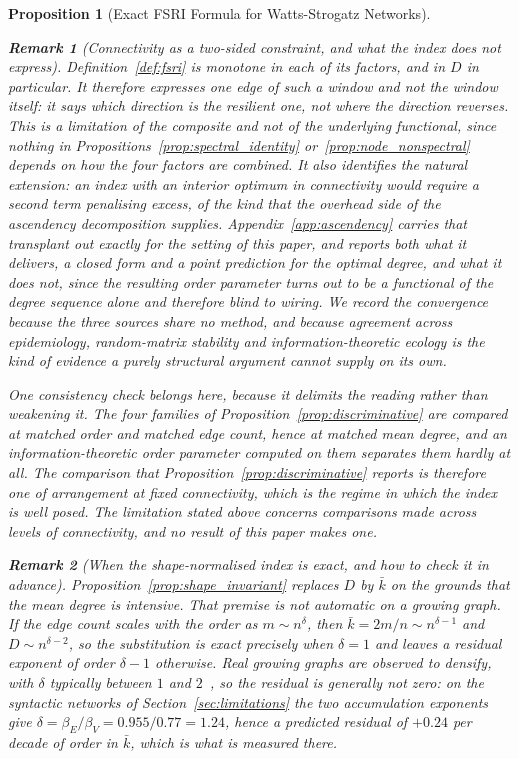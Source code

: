 \documentclass[11pt,a4paper]{article}
\newtheorem{proposition}{Proposition}
\newtheorem{remark}{Remark}
\begin{document}
\begin{proposition}[Exact FSRI Formula for Watts-Strogatz Networks]
\begin{remark}[Connectivity as a two-sided constraint, and what the index does
not express]
Definition~\ref{def:fsri} is monotone in each of its factors, and in $D$ in
particular. It therefore expresses one edge of such a window and not the window
itself: it says which direction is the resilient one, not where the direction
reverses. This is a limitation of the composite and not of the underlying
functional, since nothing in Propositions~\ref{prop:spectral_identity}
or~\ref{prop:node_nonspectral} depends on how the four factors are combined.
It also identifies the natural extension: an
index with an interior optimum in connectivity would require a second term
penalising excess, of the kind that the overhead side of the ascendency
decomposition supplies. Appendix~\ref{app:ascendency} carries that transplant
out exactly for the setting of this paper, and reports both what it delivers, a
closed form and a point prediction for the optimal degree, and what it does
not, since the resulting order parameter turns out to be a functional of the
degree sequence alone and therefore blind to wiring. We record the convergence because the three sources
share no method, and because agreement across epidemiology, random-matrix
stability and information-theoretic ecology is the kind of evidence a purely
structural argument cannot supply on its own.

One consistency check belongs here, because it delimits the reading rather than
weakening it. The four families of Proposition~\ref{prop:discriminative} are
compared at matched order and matched edge count, hence at matched mean degree,
and an information-theoretic order parameter computed on them separates them
hardly at all. The comparison that Proposition~\ref{prop:discriminative} reports
is therefore one of arrangement at fixed connectivity, which is the regime in
which the index is well posed. The limitation stated above concerns comparisons
made \emph{across} levels of connectivity, and no result of this paper makes
one.
\end{remark}

\begin{remark}[When the shape-normalised index is exact, and how to check it
in advance]
\label{rem:densification}
Proposition~\ref{prop:shape_invariant} replaces $D$ by $\bar{k}$ on the
grounds that the mean degree is intensive. That premise is not automatic on a
growing graph. If the edge count scales with the order as $m \sim n^{\delta}$,
then $\bar{k} = 2m/n \sim n^{\delta - 1}$ and $D \sim n^{\delta-2}$, so the
substitution is exact precisely when $\delta = 1$ and leaves a residual
exponent of order $\delta - 1$ otherwise. Real growing graphs are observed to
densify, with $\delta$ typically between $1$ and $2$~\cite{leskovec2005}, so
the residual is generally not zero: on the syntactic networks of
Section~\ref{sec:limitations} the two accumulation exponents give
$\delta = \beta_E/\beta_V = 0.955/0.77 = 1.24$, hence a predicted residual of
$+0.24$ per decade of order in $\bar{k}$, which is what is measured there.


\end{remark}
\end{proposition}
\end{document}
